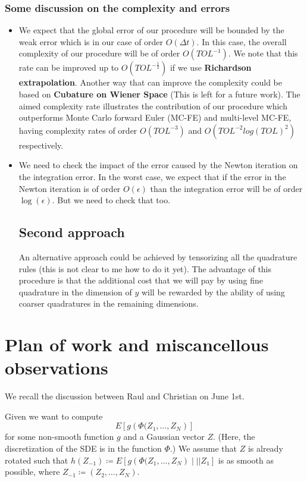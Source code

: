 \documentclass[11pt]{article}
\begin{document}
\subsubsection{Some discussion on the complexity and errors}
\begin{itemize}
	\item We expect that the global error of our procedure will be bounded by the weak error which is in our case of order $O(\Delta t)$. In this case, the overall complexity of our procedure will be of order $O(TOL^{-1})$. We note that this rate can be improved up to $O(TOL^{-\frac{1}{2}})$ if we use \textbf{Richardson extrapolation}. Another way that can improve the complexity could be based on \textbf{Cubature on Wiener Space} (This is left for a future work). The aimed complexity rate illustrates the contribution of our procedure which outperforms  Monte Carlo forward Euler (MC-FE) and multi-level MC-FE, having complexity rates of order $O(TOL^{-3})$  and $O(TOL^{-2} log(TOL)^2)$  respectively. 
	\item We need to check the impact of the error caused by the Newton iteration on the integration error. In the worst case, we expect that if the error in the Newton iteration is of order $O(\epsilon)$ than the integration error will be of order $\operatorname{log}(\epsilon)$. But we need to check that too.
	\subsection{Second approach}
	An alternative approach could be achieved by tensorizing all the quadrature rules (this is not clear to me how to do it yet). The advantage of this procedure is that the additional cost that we will pay by using fine quadrature in the dimension of $y$ will be rewarded by the ability of using coarser quadratures in the remaining dimensions.
\end{itemize}



\section{Plan of work and miscancellous observations}
\label{sec:plan-work-misc}

We recall the discussion between Raul and Christian on June 1st.

Given we want to compute
\begin{equation*}
	E\left[ g\left( \Phi(Z_1, \ldots, Z_N \right) \right]
\end{equation*}
for some non-smooth function $g$ and a Gaussian vector $Z$. (Here, the
discretization of the SDE is in the function $\Phi$.) We assume that
$Z$ is already rotated such that $h(Z_{-1}) \coloneqq E\left[ g\left(
\Phi(Z_1, \ldots, Z_N \right) \mid | \mid Z_1\right]$ is as smooth as
possible, where $Z_{-1} \coloneqq (Z_2, \ldots, Z_N)$. 
\end{document}
